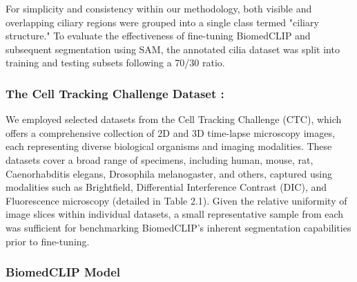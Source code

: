 \documentclass[./dissertation.tex]{subfiles}
\begin{document}
For simplicity and consistency within our methodology, both visible and overlapping ciliary regions were grouped into a single class termed "ciliary structure." To evaluate the effectiveness of fine-tuning BiomedCLIP and subsequent segmentation using SAM, the annotated cilia dataset was split into training and testing subsets following a 70/30 ratio.

\subsubsection{The Cell Tracking Challenge Dataset \cite{mavska2023cell}:}
We employed selected datasets from the Cell Tracking Challenge (CTC), which offers a comprehensive collection of 2D and 3D time-lapse microscopy images, each representing diverse biological organisms and imaging modalities. These datasets cover a broad range of specimens, including human, mouse, rat, Caenorhabditis elegans, Drosophila melanogaster, and others, captured using modalities such as Brightfield, Differential Interference Contrast (DIC), and Fluorescence microscopy (detailed in Table 2.1). Given the relative uniformity of image slices within individual datasets, a small representative sample from each was sufficient for benchmarking BiomedCLIP's inherent segmentation capabilities prior to fine-tuning.

\subsubsection{BiomedCLIP Model}
\end{document}
